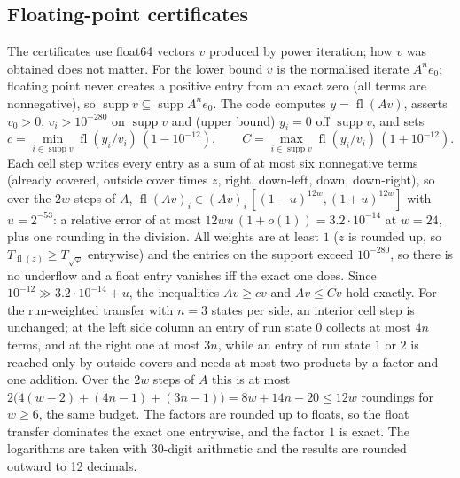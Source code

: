 \documentclass[11pt]{amsart}
\theoremstyle{definition}
\theoremstyle{remark}
\newcommand{\fl}{\operatorname{fl}}
\newcommand{\supp}{\operatorname{supp}}
\begin{document}
\subsection{Floating-point certificates}\label{sec:float}
The certificates use float64 vectors $v$ produced by power iteration; how $v$ was obtained does not
matter. For the lower bound $v$ is the normalised iterate $A^n e_0$; floating point never creates a
positive entry from an exact zero (all terms are nonnegative), so $\supp v \subseteq \supp A^n e_0$.
The code computes $y = \fl(Av)$, asserts $v_0 > 0$, $v_i > 10^{-280}$ on $\supp v$ and (upper
bound) $y_i = 0$ off $\supp v$, and sets
\[
  c = \min_{i \in \supp v} \fl(y_i / v_i)\,(1 - 10^{-12}), \qquad
  C = \max_{i \in \supp v} \fl(y_i / v_i)\,(1 + 10^{-12}).
\]
Each cell step writes every entry as a sum of at most six nonnegative terms (already covered,
outside cover times $z$, right, down-left, down, down-right), so over the $2w$ steps of $A$,
$\fl(Av)_i \in (Av)_i\,[(1-u)^{12w}, (1+u)^{12w}]$ with $u = 2^{-53}$: a relative error of at most
$12wu\,(1 + o(1)) = 3.2\cdot10^{-14}$ at $w = 24$, plus one rounding in the division. All weights
are at least $1$ ($z$ is rounded up, so $T_{\fl(z)} \ge T_{\sqrt\varphi}$ entrywise) and the
entries on the support exceed $10^{-280}$, so there is no underflow and a float entry vanishes iff
the exact one does. Since $10^{-12} \gg 3.2\cdot10^{-14} + u$, the inequalities $Av \ge cv$ and
$Av \le Cv$ hold exactly. For the run-weighted transfer with $n = 3$ states per side, an interior
cell step is unchanged; at the left side column an entry of run state $0$ collects at most $4n$ terms, and at the
right one at most $3n$, while an entry of run state $1$ or $2$ is reached only by outside covers and
needs at most two products by a factor and one addition. Over the $2w$ steps of $A$ this is at most
$2\bigl(4(w-2) + (4n-1) + (3n-1)\bigr) = 8w + 14n - 20 \le 12w$ roundings for $w \ge 6$, the same
budget. The factors are rounded up to floats, so the float transfer dominates the exact one
entrywise, and the factor $1$ is exact. The logarithms are taken with 30-digit arithmetic and the results are
rounded outward to 12 decimals.
\end{document}
